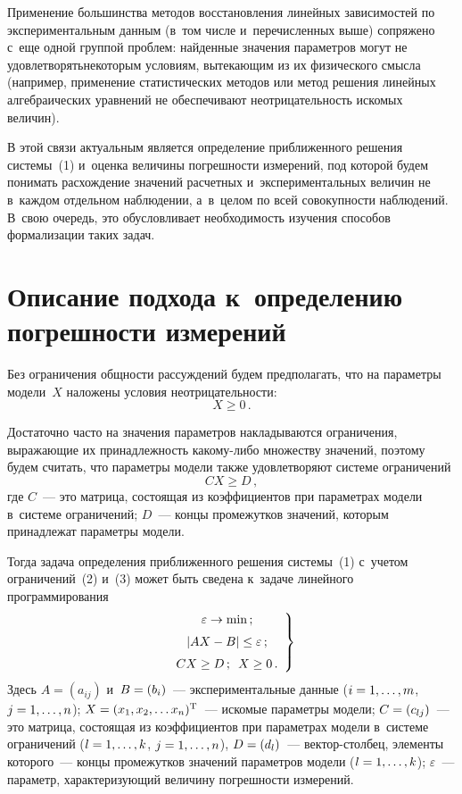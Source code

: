 \begin{multicols}{2}
  Применение большинства методов вос\-ста\-нов\-ле\-ния линейных зависимостей
по экспериментальным данным (в~том числе и~перечисленных выше)
сопряжено с~еще одной группой проблем: найденные значения параметров
могут не удовлетворять\linebreak некоторым условиям, вытекающим из их физи\-ческого
смысла (например, применение статисти\-ческих методов или метод решения
линейных \mbox{алгебраических} уравнений не обеспечивают не\-от\-ри\-ца\-тель\-ность
искомых величин).

  В этой связи актуальным является определение приближенного решения
системы~(1) и~оценка величины погрешности измерений, под которой будем
понимать расхождение значений расчетных и~экспериментальных величин
не в~каждом отдельном наблюдении, а~в~целом по всей совокупности наблюдений.
В~свою очередь, это обусловливает необходимость изучения способов
формализации таких задач.

  \section{Описание подхода к~определению погрешности
измерений}

  Без ограничения общности рассуждений будем предполагать, что на
параметры модели~$X$ наложены условия неотрицательности:
  \begin{equation}
  X\geq 0\,.
  \label{e2-spi}
  \end{equation}

  Достаточно часто на значения параметров накладываются ограничения,
выражающие их принадлежность ка\-ко\-му-ли\-бо множеству значений, поэтому
будем считать, что параметры модели также удовлетворяют системе
ограничений
  \begin{equation}
  CX\geq D\,,
  \label{e3-spi}
  \end{equation}
  где $C$~--- это матрица, состоящая из коэффициентов при параметрах
модели в~системе ограничений; $D$~--- концы промежутков значений,
которым принадлежат параметры модели.

  Тогда задача определения приближенного решения системы~(1) с~учетом
ограничений~(2) и~(3) может быть сведена к~задаче линейного
программирования
  \begin{equation}
  \left.
  \begin{array}{c}
  \varepsilon\to \min\,;\\[6pt]
  \vert AX-B\vert \leq \varepsilon\,; \\[6pt]
  CX\geq D\,;\enskip
  X\geq 0\,.
  \end{array}
  \right\}
  \label{e4-spi}
  \end{equation}
  Здесь $A=(a_{ij})$ и~$B\hm=(b_i)$~--- экспериментальные данные ($i\hm=
1,\ldots, m$, $j\hm=1,\ldots, n$); $X\hm= (x_1, x_2, \ldots
x_n)^{\mathrm{T}}$~--- искомые параметры модели; $C\hm= (c_{lj})$~--- это
матрица, состоящая из коэффициентов при параметрах модели в~системе
ограничений ($l\hm= 1,\ldots, k$, $j\hm= 1,\ldots, n$), $D\hm= (d_l)$~---
  век\-тор-стол\-бец, элементы которого~--- концы промежутков значений
параметров модели ($l\hm= 1,\ldots, k$); $\varepsilon$~--- параметр,
характеризующий величину погрешности измерений.


\end{multicols}
